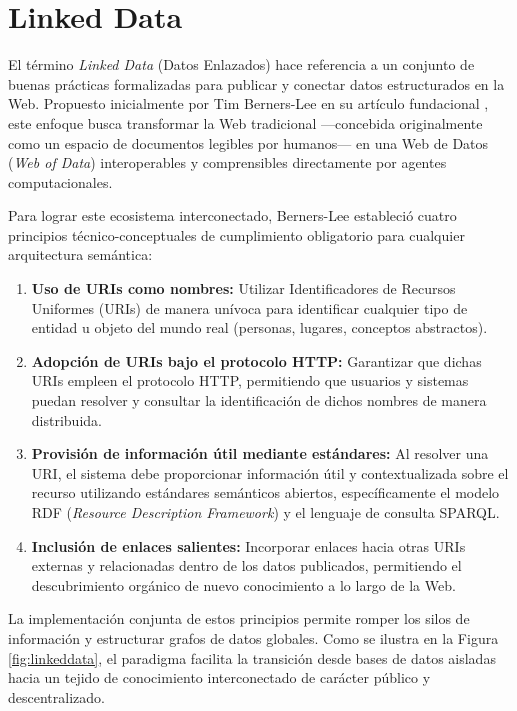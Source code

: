 \documentclass{article}
\begin{document}
\section{Linked Data}

El término \textit{Linked Data} (Datos Enlazados) hace referencia a un conjunto de buenas prácticas formalizadas para publicar y conectar datos estructurados en la Web. Propuesto inicialmente por Tim Berners-Lee en su artículo fundacional \cite{berners2006linked}, este enfoque busca transformar la Web tradicional —concebida originalmente como un espacio de documentos legibles por humanos— en una Web de Datos (\textit{Web of Data}) interoperables y comprensibles directamente por agentes computacionales.

Para lograr este ecosistema interconectado, Berners-Lee estableció cuatro principios técnico-conceptuales de cumplimiento obligatorio para cualquier arquitectura semántica:

\begin{enumerate}
    \item \textbf{Uso de URIs como nombres:} Utilizar Identificadores de Recursos Uniformes (URIs) de manera unívoca para identificar cualquier tipo de entidad u objeto del mundo real (personas, lugares, conceptos abstractos).
    \item \textbf{Adopción de URIs bajo el protocolo HTTP:} Garantizar que dichas URIs empleen el protocolo HTTP, permitiendo que usuarios y sistemas puedan resolver y consultar la identificación de dichos nombres de manera distribuida.
    \item \textbf{Provisión de información útil mediante estándares:} Al resolver una URI, el sistema debe proporcionar información útil y contextualizada sobre el recurso utilizando estándares semánticos abiertos, específicamente el modelo RDF (\textit{Resource Description Framework}) y el lenguaje de consulta SPARQL.
    \item \textbf{Inclusión de enlaces salientes:} Incorporar enlaces hacia otras URIs externas y relacionadas dentro de los datos publicados, permitiendo el descubrimiento orgánico de nuevo conocimiento a lo largo de la Web.
\end{enumerate}

La implementación conjunta de estos principios permite romper los silos de información y estructurar grafos de datos globales. Como se ilustra en la Figura \ref{fig:linkeddata}, el paradigma facilita la transición desde bases de datos aisladas hacia un tejido de conocimiento interconectado de carácter público y descentralizado.
\end{document}
